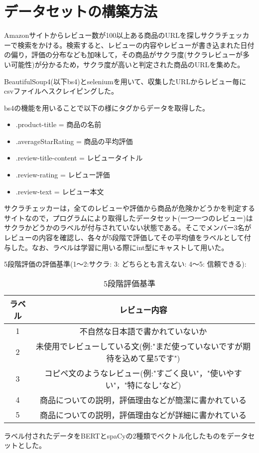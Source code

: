 \documentclass[a4paper,11pt,titlepage]{jsarticle}
\begin{document}
\section{データセットの構築方法}\label{6}
Amazonサイトからレビュー数が100以上ある商品のURLを探しサクラチェッカー\cite{3}で検索をかける。検索すると、レビューの内容やレビューが書き込まれた日付の偏り，評価の分布なども加味して，その商品がサクラ度(サクラレビューが多い可能性)が分かるため，サクラ度が高いと判定された商品のURLを集めた。

BeautifulSoup4(以下bs4)とselenium\cite{6}を用いて、収集したURLからレビュー毎にcsvファイルへスクレイピング\cite{2}した。

bs4の機能を用いることで以下の様にタグからデータを取得した。

\begin{itemize}
\item .product-title = 商品の名前
\item .averageStarRating = 商品の平均評価
\item .review-title-content = レビュータイトル
\item .review-rating = レビュー評価
\item .review-text = レビュー本文
\end{itemize}

サクラチェッカーは，全てのレビューや評価から商品が危険かどうかを判定するサイトなので，プログラムにより取得したデータセット(一つ一つのレビュー)はサクラかどうかのラベルが付与されていない状態である。そこでメンバー3名がレビューの内容を確認し、各々が5段階で評価してその平均値をラベルとして付与した。なお、ラベルは学習に用いる際にint型にキャストして用いた。

5段階評価の評価基準(1〜2:サクラ: 3: どちらとも言えない: 4〜5: 信頼できる):
\begin{table}[H]
	\centering
	\caption{5段階評価基準}
	\label{asses}
	\begin{tabular}{|c|c|}
		\hline
		ラベル & レビュー内容\\
		\hline
		\hline
		1 & 不自然な日本語で書かれていないか \\
		\hline
		2 & 未使用でレビューしている文(例:"まだ使っていないですが期待を込めて星5です") \\
		\hline
		3 & コピペ文のようなレビュー(例:"すごく良い"，"使いやすい"，"特になし"など) \\
		\hline
		4 & 商品についての説明，評価理由などが簡潔に書かれている \\
		\hline
		5 & 商品についての説明，評価理由などが詳細に書かれている \\
		\hline
	\end{tabular}
\end{table}
ラベル付されたデータをBERTとspaCyの2種類でベクトル化したものをデータセットとした。
\end{document}

